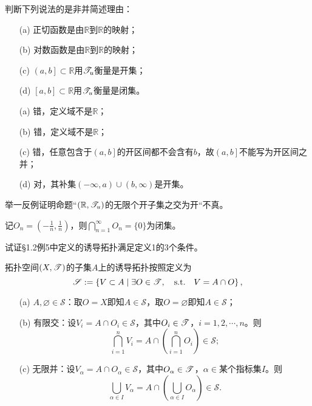 \begin{xiti}
	\item 判断下列说法的是非并简述理由：
	\begin{enumerate}
		\item[(a)] 正切函数是由$\mathbb{R}$到$\mathbb{R}$的映射；
		\item[(b)] 对数函数是由$\mathbb{R}$到$\mathbb{R}$的映射；
		\item[(c)] $\left(a,b\right]\subset \mathbb{R}$用$\mathscr{T}_u$衡量是开集；
		\item[(d)] $\left[a,b\right]\subset \mathbb{R}$用$\mathscr{T}_u$衡量是闭集。
	\end{enumerate}

	\begin{jie}
		\begin{enumerate}
			\item[(a)] 错，定义域不是$\mathbb{R}$；
			\item[(b)] 错，定义域不是$\mathbb{R}$；
			\item[(c)] 错，任意包含于$\left(a,b\right]$的开区间都不会含有$b$，故$\left(a,b\right]$不能写为开区间之并；
			\item[(d)] 对，其补集$(-\infty,a)\cup (b,\infty)$是开集。
		\end{enumerate}
	\end{jie}


	\item 举一反例证明命题“$\left(\mathbb{R},\mathscr{T}_u\right)$的无限个开子集之交为开“不真。

	\begin{zm}
		记$\displaystyle O_n=\left(-\frac{1}{n},\frac{1}{n}\right)$，则$\displaystyle\bigcap_{n=1}^{\infty} O_n=\{0\}$为闭集。
	\end{zm}

	\item 试证\S 1.2例5中定义的诱导拓扑满足定义1的3个条件。

	\begin{zm}
		拓扑空间$(X,\mathscr{T})$的子集$A$上的诱导拓扑按照定义为
		\begin{equation*}
			\mathscr{S}:=\left\{ V\subset A\mid \exists O\in \TT, \qq{s.t.}V=A\cap O \right\},
		\end{equation*}
		\begin{enumerate}
			\item[(a)] $A,\varnothing \in \mathscr{S}$：取$O=X$即知$A\in\mathscr{S}$，取$O=\varnothing$即知$A\in \mathscr{S}$；
			\item[(b)] 有限交：设$V_i=A\cap O_i\in \mathscr{S}$，其中$O_i\in\mathscr{T} $，$i=1,2,\cdots,n$。则
			\begin{equation*}
			\bigcap_{i=1}^n V_i =A\cap \left(\bigcap_{i=1}^n O_i \right)\in \mathscr{S};
			\end{equation*}
			\item[(c)] 无限并：设$V_\alpha=A\cap O_\alpha \in \mathscr{S}$，其中$O_\alpha\in\mathscr{T} $，$\alpha\in \text{某个指标集} I$。则
			\begin{equation*}
			\bigcup_{\alpha\in I} V_\alpha =A\cap \left(\bigcup_{\alpha\in I} O_\alpha \right)\in \mathscr{S}.
			\end{equation*}
		\end{enumerate}
	\end{zm}


\end{xiti}
